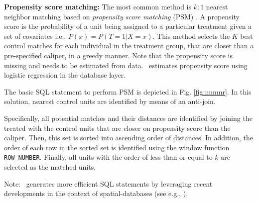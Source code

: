 {\bf Propensity score matching:}
\label{sec:nnm}
The most common method is $k:1$ nearest neighbor
matching based on {\em propensity score matching} (PSM) \cite{Rubin1983b}.  A propensity score is the probability of a unit being assigned to a particular 
treatment given a set of  covariates i.e., $P(x)=P(T=1|X=x)$.  This method
 selects the $K$ best control matches for each individual
in the treatment group, that are closer than a pre-specified caliper, in a greedy manner.   Note that the propensity score
is missing and needs to be estimated from data.
\GSQL\ estimates propensity score using logistic regression in the database layer.

The basic SQL statement to perform PSM
is depicted in Fig. \ref{fig:nnmnr}.
In this solution,
nearest control units are identified
by means of an anti-join.  Specifically, all potential matches and their distances are identified by
joining the treated with the control units that are closer on propensity score than
the caliper. Then, this set is sorted into ascending order of
distances.  In addition, the order of each row in the sorted set is identified
using the window function {\verb|ROW_NUMBER|}. Finally, all units with the order of less than or equal to $k$ are selected as the matched units.

Note: \GSQL\  generates more efficient SQL statements by
leveraging recent developments in the context of spatial-databases
(see e.g., \cite{obe2015postgis}).



